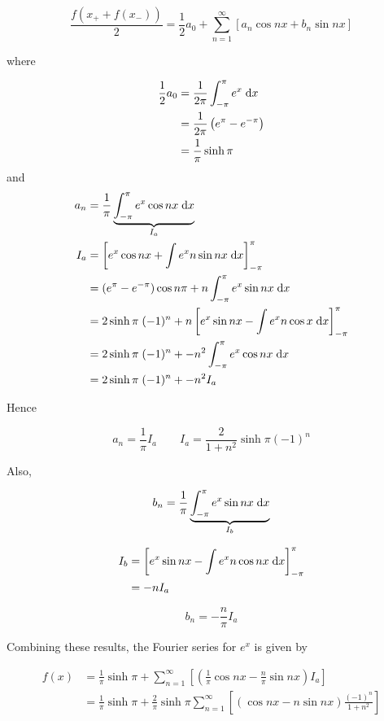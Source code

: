 \documentclass[a4paper]{article}
\begin{document}
\[ \frac{f(x_{+} + f(x_{-}))}{2} = \frac{1}{2} a_{0} + \sum_{n=1}^{\infty} \left[ a_{n} \cos n x + b_{n} \sin n x  \right]  \]


where 

\begin{align*}
\frac{1}{2} a_{0} & = \frac{1}{2\pi} \int_{-\pi}^{\pi} e^{x} \; \mathrm{d} x \\
& = \frac{1}{2\pi} \left(  e^{\pi} - e^{-\pi} \right) \\
& = \frac{1}{\pi} \sinh \pi
\end{align*}
and 
\begin{align*}
a_{n} & = \frac{1}{\pi} \underbrace{ \int_{-\pi}^{\pi} e^{x} \cos n x \; \mathrm{d} x}_{I_{a}}  \\
I_{a} & =  \left[   e^{x} \cos n x + \int e^{x} n \sin n x  \; \mathrm{d} x  \right]_{-\pi}^{\pi} \\
& = (e^{\pi} - e^{-\pi}  )\cos n \pi + n \int_{-\pi}^{\pi} e^{x} \sin n x \;\mathrm{d} x \\
& = 2 \sinh \pi \;  (-1)^{n} + n \left[  e^{x} \sin n x - \int e^{x} n \cos x \; \mathrm{d} x  \right]_{-\pi}^{\pi} \\
& =  2 \sinh \pi \;  (-1)^{n} + -n^{2} \int_{-\pi}^{\pi} e^{x} \cos n x \; \mathrm{d} x \\
& =  2 \sinh \pi \;  (-1)^{n} + -n^{2} I_{a}
\end{align*}

Hence 

\[ a_{n} = \frac{1}{\pi} I_{a} \qquad I_{a} = \frac{2}{1 + n^{2}} \sinh \pi (-1)^{n} \]

Also,

\[ b_{n} =  \frac{1}{\pi} \underbrace{\int_{-\pi}^{\pi}  e^{x} \sin n x \; \mathrm{d} x }_{I_{b}} \]

\begin{align*}
I_{b} & = \left[  e^{x} \sin n x - \int e^{x} n \cos n x \; \mathrm{d} x  \right]_{-\pi}^{\pi}  \\
& = -n I_{a}
\end{align*}

\[ b_{n} = - \frac{n}{\pi} I_{a} \]

Combining these results, the Fourier series for $ e^{x} $ is given by

\begin{align*}
f(x) & = \frac{1}{\pi} \sinh \pi  + \sum_{n=1}^{\infty} \left[  \left(  \frac{1}{\pi} \cos n x - \frac{n}{\pi} \sin n x \right) I_{a}  \right]  \\
& = \frac{1}{\pi} \sinh \pi + \frac{2}{\pi} \sinh \pi \sum_{n=1}^{\infty} \left[  (\cos n x - n \sin n x) \frac{(-1)^{n}}{1+n^{2}} \right] 
\end{align*}
\end{document}
